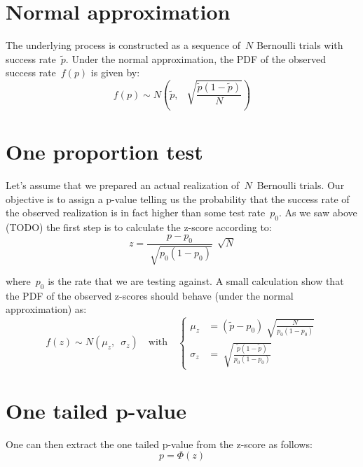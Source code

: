\documentclass{article}
\begin{document}
\section{Normal approximation}

The underlying process is constructed as a sequence of~$N$ Bernoulli trials with success rate~$\tilde{p}$. Under the normal approximation, the PDF of the observed success rate~$f(p)$ is given by:
\begin{equation}
f(p) \sim N \left( \tilde{p}, \,\,\, \sqrt[]{\frac{\tilde{p} (1 - \tilde{p})}{N}} \right)
\end{equation}

\section{One proportion test}

Let's assume that we prepared an actual realization of~$N$~Bernoulli trials.  Our objective is to assign a p-value telling us the probability that the success rate of the observed realization is in fact higher than some test rate~$p_0$. As we saw above (TODO) the first step is to calculate the z-score according to:
\begin{equation}
z = \frac{p - p_0}{\sqrt[]{p_0 (1 - p_0)}} \, \sqrt[]{N}
\end{equation}

\noindent where~$p_0$ is the rate that we are testing against.  A small calculation show that the PDF of the observed z-scores should behave (under the normal approximation) as:
\begin{equation}
f(z) \sim N \left( \mu_z , \,\,\, \sigma_z \right) \quad \mbox{with} \quad 
\begin{cases}
    \mu_z  & = \left( \tilde{p}  - p_0 \right) \sqrt[]{\frac{N}{p_0 (1 - p_0)}} \\
    \sigma_z & = \sqrt[]{\frac{\tilde{p} (1 - \tilde{p})}{p_0 (1 - p_0) }}
  \end{cases}
\end{equation}

\section{One tailed p-value}

One can then extract the one tailed p-value from the z-score as follows:
\begin{equation}
p = \Phi \left( z \right)
\end{equation}
\end{document}
